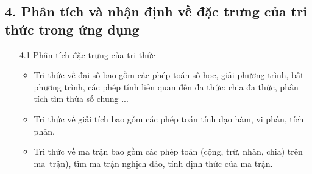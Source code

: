 \documentclass{article}
\begin{document}
 \subsection*{4. Phân tích và nhận định về đặc trưng của tri thức trong ứng dụng}

\begin{enumerate}
\item [4.1] Phân tích đặc trưng của tri thức
\begin{itemize}
\item Tri thức về đại số bao gồm các phép toán số học, giải phương trình, bất phương trình, các phép tính liên quan đến đa thức: chia đa thức, phân tích tìm thừa số chung ... 
\item Tri thức về giải tích bao gồm các phép toán tính đạo hàm, vi phân, tích phân.
\item Tri thức về ma trận bao gồm các phép toán (cộng, trừ, nhân, chia) trên ma~trận), tìm ma trận nghịch đảo, tính định thức của ma trận.
\end{itemize}


\end{enumerate}
\end{document}
